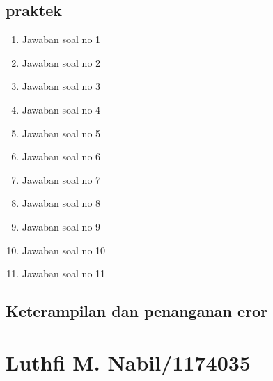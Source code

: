 \subsection{praktek}
\begin{enumerate}
    \item Jawaban soal no 1
    
    \item Jawaban soal no 2
    
    \item Jawaban soal no 3
    
    \item Jawaban soal no 4
    
    \item Jawaban soal no 5
    
    \item Jawaban soal no 6
    
    \item Jawaban soal no 7
    
    \item Jawaban soal no 8
    
    \item Jawaban soal no 9
    
    \item Jawaban soal no 10
    
    \item Jawaban soal no 11
    
\end{enumerate}

\subsection{Keterampilan dan penanganan eror}
    



\section{Luthfi M. Nabil/1174035}
